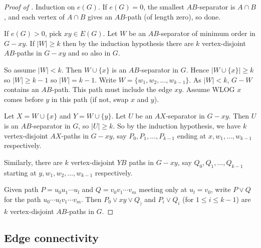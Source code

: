 \documentclass{article}
\begin{document}
\begin{proof}[Proof of ]
    Induction on $e(G)$.
    If $e(G) = 0$, the smallest $AB$-separator is $A \cap B$, and each vertex of $A \cap B$ gives an $AB$-path (of length zero), so done.

    If $e(G) > 0$, pick $xy \in E(G)$.
    Let $W$ be an $AB$-separator of minimum order in $G - xy$.
    If $|W| \geq k$ then by the induction hypothesis there are $k$ vertex-disjoint $AB$-paths in $G-xy$ and so also in $G$.

    So assume $|W| < k$. Then $W \cup \{x\}$ is an $AB$-separator in $G$.
    Hence $|W \cup \{x\}| \geq k$ so $|W| \geq k-1$ so $|W| = k-1$.
    Write $W = \{w_1, w_2, \dotsc, w_{k-1}\}$. As $|W| < k$, $G-W$ contains an $AB$-path.
    This path must include the edge $xy$.
    Assume WLOG $x$ comes before $y$ in this path (if not, swap $x$ and $y$).

    Let $X = W \cup \{x\}$ and $Y = W \cup \{y\}$.
    Let $U$ be an $AX$-separator in $G-xy$. Then $U$ is an $AB$-separator in $G$, so $|U| \geq k$.
    So by the induction hypothesis, we have $k$ vertex-disjoint $AX$-paths in $G-xy$, say $P_0, P_1, \dotsc, P_{k-1}$ ending at $x, w_1, \dotsc, w_{k-1}$ respectively.

    Similarly, there are $k$ vertex-disjoint $YB$ paths in $G-xy$, say $Q_0, Q_1, \dotsc, Q_{k-1}$ starting at $y, w_1, w_2, \dotsc, w_{k-1}$ respectively.

    Given path $P=u_0 u_1 \dotsm u_l$ and $Q = v_0 v_1 \dotsm v_m$ meeting only at $u_l = v_0$, write $P \vee Q$ for the path $u_0 \dotsm u_l v_1 \dotsm v_m$.
    Then $P_0 \vee xy \vee Q_)$ and $P_i \vee Q_i$ (for $1 \leq i \leq k-1$) are $k$ vertex-disjoint $AB$-paths in $G$.
\end{proof}


















\subsection{Edge connectivity}
\end{document}
